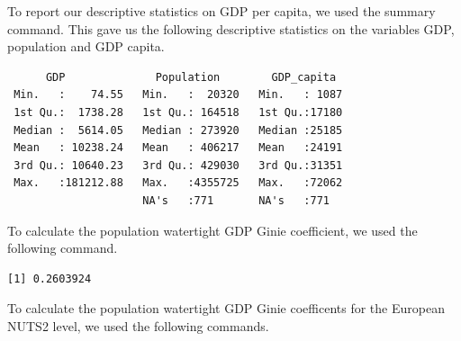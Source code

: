 \documentclass[
  a4paper,
  DIV=11,
  numbers=noendperiod]{scrartcl}
\newenvironment{Shaded}{\begin{snugshade}}{\end{snugshade}}
\newcommand{\AttributeTok}[1]{\textcolor[rgb]{0.40,0.45,0.13}{#1}}
\newcommand{\DecValTok}[1]{\textcolor[rgb]{0.68,0.00,0.00}{#1}}
\newcommand{\FunctionTok}[1]{\textcolor[rgb]{0.28,0.35,0.67}{#1}}
\newcommand{\NormalTok}[1]{\textcolor[rgb]{0.00,0.23,0.31}{#1}}
\newcommand{\OtherTok}[1]{\textcolor[rgb]{0.00,0.23,0.31}{#1}}
\newcommand{\SpecialCharTok}[1]{\textcolor[rgb]{0.37,0.37,0.37}{#1}}
\begin{document}
To report our descriptive statistics on GDP per capita, we used the
summary command. This gave us the following descriptive statistics on
the variables GDP, population and GDP capita.

\begin{verbatim}
      GDP              Population        GDP_capita   
 Min.   :    74.55   Min.   :  20320   Min.   : 1087  
 1st Qu.:  1738.28   1st Qu.: 164518   1st Qu.:17180  
 Median :  5614.05   Median : 273920   Median :25185  
 Mean   : 10238.24   Mean   : 406217   Mean   :24191  
 3rd Qu.: 10640.23   3rd Qu.: 429030   3rd Qu.:31351  
 Max.   :181212.88   Max.   :4355725   Max.   :72062  
                     NA's   :771       NA's   :771    
\end{verbatim}

To calculate the population watertight GDP Ginie coefficient, we used
the following command.

\begin{Shaded}
\end{Shaded}

\begin{verbatim}
[1] 0.2603924
\end{verbatim}

To calculate the population watertight GDP Ginie coefficents for the
European NUTS2 level, we used the following commands.

\begin{Shaded}
\end{Shaded}
\end{document}
